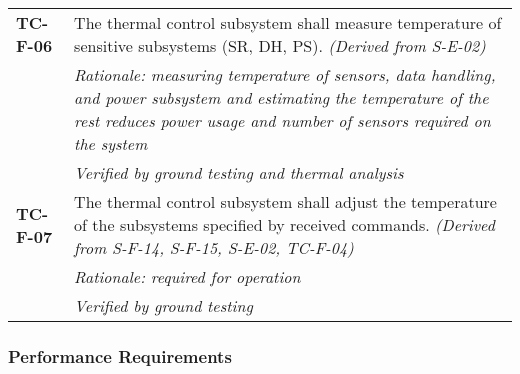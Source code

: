 \begin{longtable}{P{2cm}P{13.25cm}}
\textbf{TC-F-06}	& The thermal control subsystem shall measure temperature of sensitive subsystems (SR, DH, PS). \textit{(Derived from S-E-02)} \\
 & \textit{Rationale: measuring temperature of sensors, data handling, and power subsystem and estimating the temperature of the rest reduces power usage and number of sensors required on the system} \\
 & \textit{Verified by ground testing and thermal analysis}		\\

\textbf{TC-F-07}	& The thermal control subsystem shall adjust the temperature of the subsystems specified by received commands. \textit{(Derived from S-F-14, S-F-15, S-E-02, TC-F-04)} \\
 & \textit{Rationale: required for operation} \\
 & \textit{Verified by ground testing}
\end{longtable}
\vspace{-15pt}
\subsubsection*{Performance Requirements}
\vspace{-15pt}

